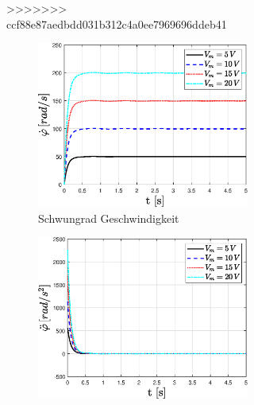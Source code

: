 \begin{figure}
\begin{figure}
>>>>>>> ccf88e87aedbdd031b312c4a0ee7969696ddeb41
    \captionsetup[subfigure]{justification=centering,font=footnotesize}
    \begin{subfigure}[b]{0.49\linewidth}
        \includegraphics[width=\linewidth]{Bilder/5_sensi/fig/Vm_sprung/phi_punkt.eps}
        \caption{Schwungrad Geschwindigkeit}
        \label{fig:Vm_sprung_phi_punkt}
    \end{subfigure}
    \begin{subfigure}[b]{0.49 \linewidth}
        \includegraphics[width=\linewidth]{Bilder/5_sensi/fig/Vm_sprung/phi_punkt_punkt.eps}

\end{subfigure}
\end{figure}
\end{figure}
